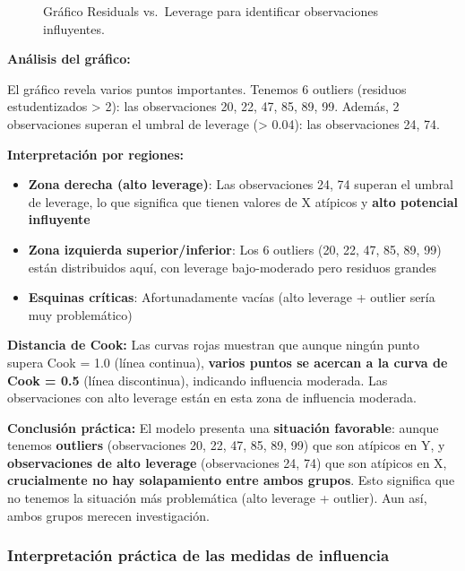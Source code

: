 \documentclass[
  letterpaper,
  DIV=11,
  numbers=noendperiod]{scrreprt}
\providecommand{\tightlist}{%
  \setlength{\itemsep}{0pt}\setlength{\parskip}{0pt}}
\begin{document}
\begin{tcolorbox}
\begin{figure}[H]
{}

\caption{\label{fig-leverage}Gráfico Residuals vs.~Leverage para
identificar observaciones influyentes.}

\end{figure}%

\textbf{Análisis del gráfico:}

El gráfico revela varios puntos importantes. Tenemos 6 outliers
(residuos estudentizados \textgreater{} 2): las observaciones 20, 22,
47, 85, 89, 99. Además, 2 observaciones superan el umbral de leverage
(\textgreater{} 0.04): las observaciones 24, 74.

\textbf{Interpretación por regiones:}

\begin{itemize}
\tightlist
\item
  \textbf{Zona derecha (alto leverage)}: Las observaciones 24, 74
  superan el umbral de leverage, lo que significa que tienen valores de
  X atípicos y \textbf{alto potencial influyente}
\item
  \textbf{Zona izquierda superior/inferior}: Los 6 outliers (20, 22, 47,
  85, 89, 99) están distribuidos aquí, con leverage bajo-moderado pero
  residuos grandes
\item
  \textbf{Esquinas críticas}: Afortunadamente vacías (alto leverage +
  outlier sería muy problemático)
\end{itemize}

\textbf{Distancia de Cook:} Las curvas rojas muestran que aunque ningún
punto supera Cook = 1.0 (línea continua), \textbf{varios puntos se
acercan a la curva de Cook = 0.5} (línea discontinua), indicando
influencia moderada. Las observaciones con alto leverage están en esta
zona de influencia moderada.

\textbf{Conclusión práctica:} El modelo presenta una \textbf{situación
favorable}: aunque tenemos \textbf{outliers} (observaciones 20, 22, 47,
85, 89, 99) que son atípicos en Y, y \textbf{observaciones de alto
leverage} (observaciones 24, 74) que son atípicos en X,
\textbf{crucialmente no hay solapamiento entre ambos grupos}. Esto
significa que no tenemos la situación más problemática (alto leverage +
outlier). Aun así, ambos grupos merecen investigación.

\end{tcolorbox}

\subsubsection{Interpretación práctica de las medidas de
influencia}\label{interpretaciuxf3n-pruxe1ctica-de-las-medidas-de-influencia}
\end{document}

